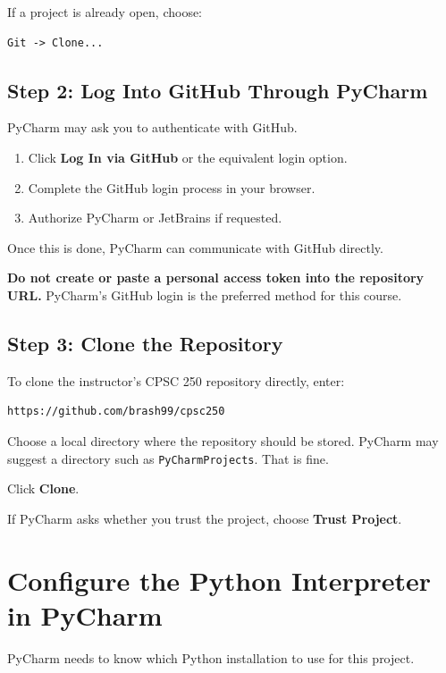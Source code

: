 \documentclass[11pt]{article}
\begin{document}
If a project is already open, choose:

\begin{lstlisting}[style=terminal]
Git -> Clone...
\end{lstlisting}

\subsection*{Step 2: Log Into GitHub Through PyCharm}

PyCharm may ask you to authenticate with GitHub.

\begin{enumerate}
    \item Click \textbf{Log In via GitHub} or the equivalent login option.
    \item Complete the GitHub login process in your browser.
    \item Authorize PyCharm or JetBrains if requested.
\end{enumerate}

Once this is done, PyCharm can communicate with GitHub directly.

\textbf{Do not create or paste a personal access token into the repository URL.} PyCharm's GitHub login is the preferred method for this course.

\subsection*{Step 3: Clone the Repository}

To clone the instructor's CPSC 250 repository directly, enter:

\begin{lstlisting}[style=terminal]
https://github.com/brash99/cpsc250
\end{lstlisting}

Choose a local directory where the repository should be stored. PyCharm may suggest a directory such as \texttt{PyCharmProjects}. That is fine.

Click \textbf{Clone}.

If PyCharm asks whether you trust the project, choose \textbf{Trust Project}.

\section{Configure the Python Interpreter in PyCharm}

PyCharm needs to know which Python installation to use for this project.
\end{document}
